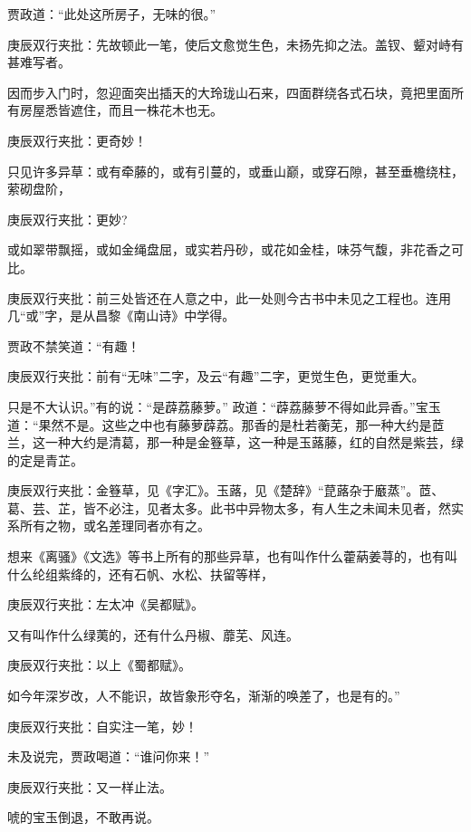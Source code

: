 \begin{parag}


    贾政道：“此处这所房子，无味的很。”\begin{note}庚辰双行夹批：先故顿此一笔，使后文愈觉生色，未扬先抑之法。盖钗、颦对峙有甚难写者。\end{note}因而步入门时，忽迎面突出插天的大玲珑山石来，四面群绕各式石块，竟把里面所有房屋悉皆遮住，而且一株花木也无。\begin{note}庚辰双行夹批：更奇妙！\end{note}只见许多异草：或有牵藤的，或有引蔓的，或垂山巅，或穿石隙，甚至垂檐绕柱，萦砌盘阶，\begin{note}庚辰双行夹批：更妙?\end{note}或如翠带飘摇，或如金绳盘屈，或实若丹砂，或花如金桂，味芬气馥，非花香之可比。\begin{note}庚辰双行夹批：前三处皆还在人意之中，此一处则今古书中未见之工程也。连用几“或”字，是从昌黎《南山诗》中学得。\end{note}贾政不禁笑道：“有趣！\begin{note}庚辰双行夹批：前有“无味”二字，及云“有趣”二字，更觉生色，更觉重大。\end{note}只是不大认识。”有的说：“是薜荔藤萝。” 政道：“薜荔藤萝不得如此异香。”宝玉道：“果然不是。这些之中也有藤萝薜荔。那香的是杜若蘅芜，那一种大约是茝兰，这一种大约是清葛，那一种是金簦草，这一种是玉蕗藤，红的自然是紫芸，绿的定是青芷。\begin{note}庚辰双行夹批：金簦草，见《字汇》。玉蕗，见《楚辞》“菎蕗杂于黀蒸”。茝、葛、芸、芷，皆不必注，见者太多。此书中异物太多，有人生之未闻未见者，然实系所有之物，或名差理同者亦有之。\end{note}想来《离骚》《文选》等书上所有的那些异草，也有叫作什么藿蒳姜荨的，也有叫什么纶组紫绛的，还有石帆、水松、扶留等样，\begin{note}庚辰双行夹批：左太冲《吴都赋》。\end{note}又有叫作什么绿荑的，还有什么丹椒、蘼芜、风连。\begin{note}庚辰双行夹批：以上《蜀都赋》。\end{note}如今年深岁改，人不能识，故皆象形夺名，渐渐的唤差了，也是有的。”\begin{note}庚辰双行夹批：自实注一笔，妙！\end{note}未及说完，贾政喝道：“谁问你来！”\begin{note}庚辰双行夹批：又一样止法。\end{note}唬的宝玉倒退，不敢再说。
\end{parag}


